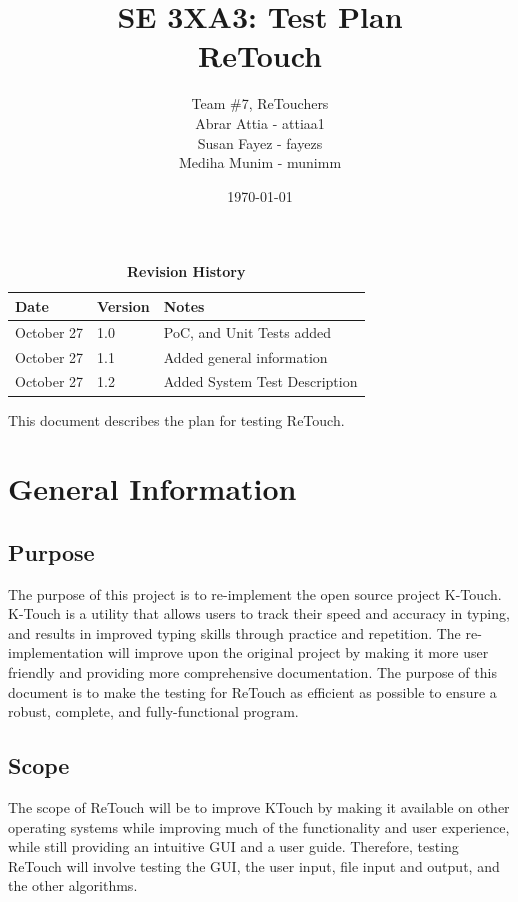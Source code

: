 \documentclass[12pt, titlepage]{article}
\title{SE 3XA3: Test Plan\\ReTouch}
\author{Team \#7, ReTouchers
		\\ Abrar Attia - attiaa1
		\\ Susan Fayez - fayezs
		\\ Mediha Munim - munimm
}
\date{\today}
\begin{document}
\maketitle

\tableofcontents
\listoftables
\listoffigures

\begin{table}[bp]
\caption{\bf Revision History}
\begin{tabularx}{\textwidth}{p{3cm}p{2cm}X}
\toprule {\bf Date} & {\bf Version} & {\bf Notes}\\
\midrule
October 27 & 1.0 & PoC, and Unit Tests added\\
October 27 & 1.1 & Added general information\\
October 27 & 1.2 & Added System Test Description\\
\bottomrule
\end{tabularx}
\end{table}

\newpage


This document describes the plan for testing ReTouch.

\section{General Information}

\subsection{Purpose}

	The purpose of this project is to re-implement the open source project K-Touch. K-Touch is a utility that allows users to track their speed and accuracy in typing, and results in improved typing skills through practice and repetition. The re-implementation will improve upon the original project by making it more user friendly and providing more comprehensive documentation. The purpose of this document is to make the testing for ReTouch as efficient as possible to ensure a robust, complete, and fully-functional program.

\subsection{Scope}

	The scope of ReTouch will be to improve KTouch by making it available on other operating systems while improving much of the functionality and user experience, while still providing an intuitive GUI and a user guide. Therefore, testing ReTouch will involve testing the GUI, the user input, file input and output, and the other algorithms. 
\end{document}
